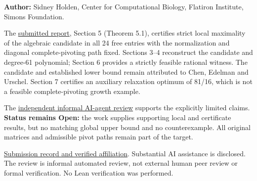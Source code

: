\documentclass[11pt,a4paper]{article}
\begin{document}
\textbf{Author:} Sidney Holden, Center for Computational Biology,
Flatiron Institute, Simons Foundation.

The
\href{https://github.com/ajt60gaibb/OpenProblemsInNLA/blob/main/references/holden-ie-extensions-2026-09-13/manuscripts/IE-11/report.pdf}{submitted
report}, Section 5 (Theorem 5.1), certifies strict local maximality of
the algebraic candidate in all 24 free entries with the normalization
and diagonal complete-pivoting path fixed. Sections 3--4 reconstruct the
candidate and degree-61 polynomial; Section 6 provides a strictly
feasible rational witness. The candidate and established lower bound
remain attributed to Chen, Edelman and Urschel. Section 7 certifies an
auxiliary relaxation optimum of 81/16, which is not a feasible
complete-pivoting growth example.

The
\href{https://github.com/ajt60gaibb/OpenProblemsInNLA/blob/main/references/holden-ie-extensions-2026-09-13/verification/review-ie11-ie20.md}{independent
informal AI-agent review} supports the explicitly limited claims.
\textbf{Status remains Open:} the work supplies supporting local and
certificate results, but no matching global upper bound and no
counterexample. All original matrices and admissible pivot paths remain
part of the target.

\href{https://github.com/ajt60gaibb/OpenProblemsInNLA/blob/main/references/holden-ie-extensions-2026-09-13/README.md}{Submission
record and verified affiliation}. Substantial AI assistance is
disclosed. The review is informal automated review, not external human
peer review or formal verification. No Lean verification was performed.
\end{document}
